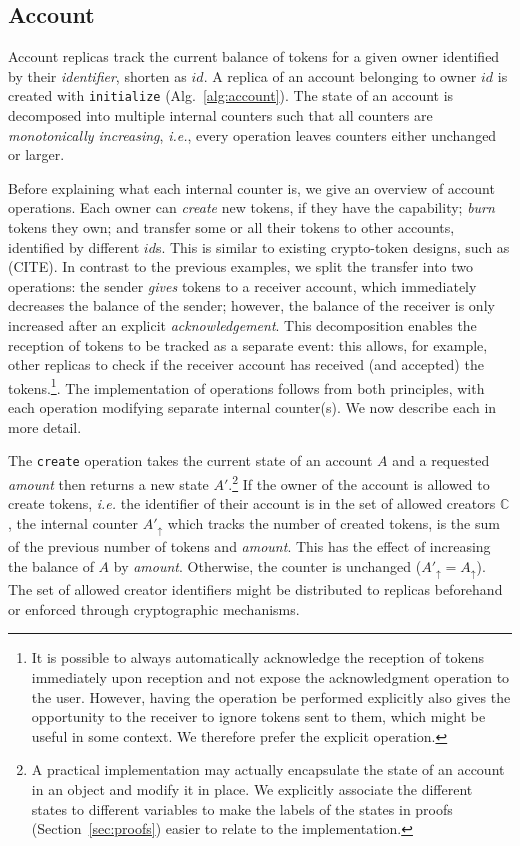 \documentclass[9pt, oneside]{article}   	%
\begin{document}
\subsection{Account}
\label{sec:account}

Account replicas track the current balance of tokens for a given owner identified by their \textit{identifier}, shorten as $id$. A replica of an account belonging to owner $id$ is created with \texttt{initialize} (Alg.~\ref{alg:account}). The state of an account is decomposed into multiple internal counters such that all counters are \textit{monotonically increasing}, \textit{i.e.}, every operation leaves counters either unchanged or larger. 

Before explaining what each internal counter is, we give an overview of account operations. Each owner can  \textit{create} new tokens, if they have the capability; \textit{burn} tokens they own; and transfer some or all their tokens to other accounts, identified by different $id$s. This is similar to existing crypto-token designs, such as (CITE). In contrast to the previous examples, we split the transfer into two operations: the sender \textit{gives} tokens to a receiver account, which immediately decreases the balance of the sender; however, the balance of the receiver is only increased after an explicit \textit{acknowledgement}. This decomposition enables the reception of tokens to be tracked as a separate event: this allows, for example, other replicas to check if the receiver account has received (and accepted) the tokens.\footnote{It is possible to always automatically acknowledge the reception of tokens immediately upon reception and not expose the acknowledgment operation to the user. However, having the operation be performed explicitly also gives the opportunity to the receiver to ignore tokens sent to them, which might be useful in some context. We therefore prefer the explicit operation.}. The implementation of operations follows from both principles, with each operation modifying separate internal counter(s). We now describe each in more detail.

The \texttt{create} operation takes the current state of an account $A$ and a requested \textit{amount} then returns a new state $A'$.\footnote{A practical implementation may actually encapsulate the state of an account in an object and modify it in place. We explicitly associate the different states to different variables to make the labels of the states in proofs (Section~\ref{sec:proofs}) easier to relate to the implementation.} If the owner of the account is allowed to create tokens, \textit{i.e.} the identifier of their account is in the set of allowed creators $\mathds{C}$, the internal counter $A'_\uparrow$ which tracks the number of created tokens, is the sum of the previous number of tokens and \textit{amount}. This has the effect of increasing the balance of $A$ by \textit{amount}. Otherwise, the counter is unchanged ($A'_\uparrow=A_\uparrow$). The set of allowed creator identifiers might be distributed to replicas beforehand or enforced through cryptographic mechanisms. 
\end{document}
